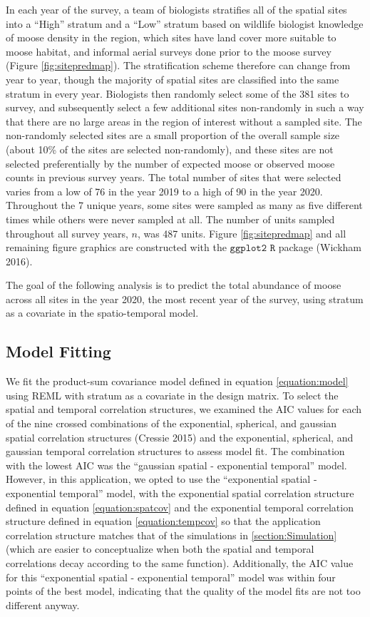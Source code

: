 \documentclass[smallextended]{svjour3}       %
\begin{document}
In each year of the survey, a team of biologists stratifies all of the
spatial sites into a ``High'' stratum and a ``Low'' stratum based on
wildlife biologist knowledge of moose density in the region, which sites
have land cover more suitable to moose habitat, and informal aerial
surveys done prior to the moose survey (Figure \ref{fig:sitepredmap}).
The stratification scheme therefore can change from year to year, though
the majority of spatial sites are classified into the same stratum in
every year. Biologists then randomly select some of the 381 sites to
survey, and subsequently select a few additional sites non-randomly in
such a way that there are no large areas in the region of interest
without a sampled site. The non-randomly selected sites are a small
proportion of the overall sample size (about 10\% of the sites are
selected non-randomly), and these sites are not selected preferentially
by the number of expected moose or observed moose counts in previous
survey years. The total number of sites that were selected varies from a
low of 76 in the year 2019 to a high of 90 in the year 2020. Throughout
the 7 unique years, some sites were sampled as many as five different
times while others were never sampled at all. The number of units
sampled throughout all survey years, \(n\), was 487 units. Figure
\ref{fig:sitepredmap} and all remaining figure graphics are constructed
with the \(\texttt{ggplot2 R}\) package (Wickham 2016).

The goal of the following analysis is to predict the total abundance of
moose across all sites in the year 2020, the most recent year of the
survey, using stratum as a covariate in the spatio-temporal model.

\hypertarget{subsection:modelfit}{%
\subsection{Model Fitting}\label{subsection:modelfit}}

We fit the product-sum covariance model defined in equation
\ref{equation:model} using REML with stratum as a covariate in the
design matrix. To select the spatial and temporal correlation
structures, we examined the AIC values for each of the nine crossed
combinations of the exponential, spherical, and gaussian spatial
correlation structures (Cressie 2015) and the exponential, spherical,
and gaussian temporal correlation structures to assess model fit. The
combination with the lowest AIC was the ``gaussian spatial - exponential
temporal'' model. However, in this application, we opted to use the
``exponential spatial - exponential temporal'' model, with the
exponential spatial correlation structure defined in equation
\ref{equation:spatcov} and the exponential temporal correlation
structure defined in equation \ref{equation:tempcov} so that the
application correlation structure matches that of the simulations in
\ref{section:Simulation} (which are easier to conceptualize when both
the spatial and temporal correlations decay according to the same
function). Additionally, the AIC value for this ``exponential spatial -
exponential temporal'' model was within four points of the best model,
indicating that the quality of the model fits are not too different
anyway.
\end{document}
